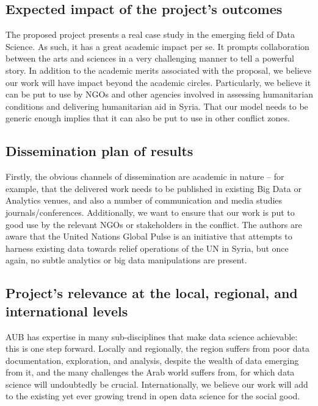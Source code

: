 \subsection{Expected impact of the project's outcomes}

The proposed project presents a real case study in the emerging field of Data Science. As such, it has a great academic impact per se. It prompts collaboration between the arts and sciences in a very challenging manner to tell a powerful story. In addition to the academic merits associated with the proposal, we believe our work will have impact beyond the academic circles. Particularly, we believe it can be put to use by NGOs and other agencies involved in assessing humanitarian conditions and delivering humanitarian aid in Syria. That our model needs to be generic enough implies that it can also be put to use in other conflict zones. 



\subsection{Dissemination plan of results}

Firstly, the obvious channels of dissemination are academic in nature -- for example, that the delivered work needs to be published in existing Big Data or Analytics venues, and also a number of communication and media studies journals/conferences. Additionally, we want to ensure that our work is put to good use by the relevant NGOs or stakeholders in the conflict. The authors are aware that the United Nations Global Pulse is an initiative that attempts to harness existing data towards relief operations of the UN in Syria, but once again, no subtle analytics or big data manipulations are present.


\subsection{Project's relevance at the local, regional, and international levels}

AUB has expertise in many sub-disciplines that make data science achievable: this is one step forward. Locally and regionally, the region suffers from poor data documentation, exploration, and analysis, despite the wealth of data emerging from it, and the many challenges the Arab world suffers from, for which data science will undoubtedly be crucial. Internationally, we believe our work will add to the existing yet ever growing trend in open data science for the social good. 
